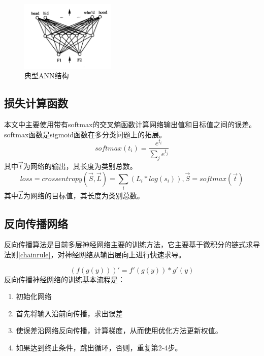 \begin{figure}[!hbp]
\begin{center}
\includegraphics[width=0.4\textwidth]{graphic/ann2.png}
\caption{典型ANN结构\cite{ml2006} \label{ann2}}
\end{center}
\end{figure}

\subsection{损失计算函数}
本文中主要使用带有softmax的交叉熵函数计算网络输出值和目标值之间的误差。softmax函数是sigmoid函数在多分类问题上的拓展。
\begin{equation}
softmax(t_i) = \frac{e^{t_i}}{\sum_j{e^{t_j}}}
\end{equation}
其中$\vec{t}$为网络的输出，其长度为类别总数。
\begin{equation}
loss = crossentropy(\vec{S}, \vec{L}) 
= \sum_i {(L_i * log(s_i))}, \vec{S} = softmax{(\vec{t})}
\end{equation}
其中$\vec{L}$为网络的目标值，其长度为类别总数。

\subsection{反向传播网络}
反向传播算法是目前多层神经网络主要的训练方法，它主要基于微积分的链式求导法则\ref{chainrule}，对神经网络从输出层向上进行快速求导。

\begin{equation} \label{chainrule}
(f(g(y)))' = f'(g(y)) * g'(y)
\end{equation}
反向传播神经网络的训练基本流程是：\par
\begin{enumerate}
\item 初始化网络
\item 首先将输入沿前向传播，求出误差
\item 使误差沿网络反向传播，计算梯度，从而使用优化方法更新权值。
\item 如果达到终止条件，跳出循环，否则，重复第2-4步。
\end{enumerate}

